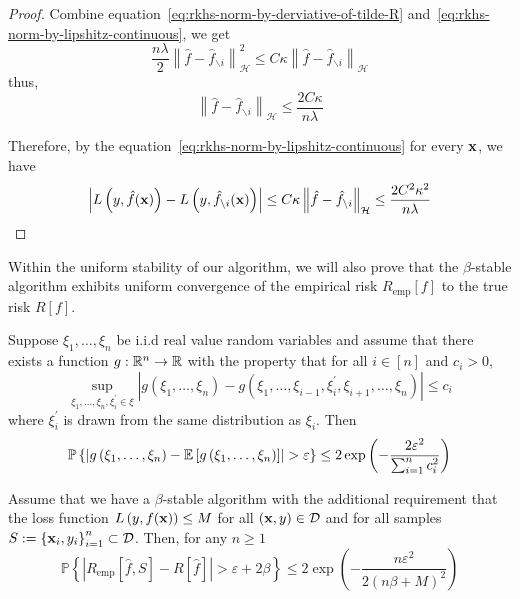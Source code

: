 \begin{proof}
	Combine equation~\eqref{eq:rkhs-norm-by-derviative-of-tilde-R} and~\eqref{eq:rkhs-norm-by-lipshitz-continuous}, we get
	\begin{equation}
		\frac{n\lambda}{2}\left\|\hat{f}-\hat{f}_{\backslash i}\right\|_{\mathcal{H}}^{2}\leq C\kappa\left\|\hat{f}-\hat{f}_{\backslash i}\right\|_{\mathcal{H}}
	\end{equation}
	thus,
	\begin{equation}
		\left\|\hat{f}-\hat{f}_{\backslash i}\right\|_{\mathcal{H}}\leq\frac{2C\kappa}{n\lambda}
	\end{equation}

	Therefore, by the equation~\eqref{eq:rkhs-norm-by-lipshitz-continuous} for every \(\mathbf{x}\), we have
	\begin{equation}
		\left|L\left(y,\hat{f}(\mathbf{x})\right)-L\left(y,\hat{f}_{\backslash i}(\mathbf{x})\right)\right|\leq C\kappa\left\|\hat{f}-\hat{f}_{\backslash i}\right\|_{\mathcal{H}}\leq\frac{2C^{2}\kappa^{2}}{n\lambda}
	\end{equation}
\end{proof}

Within the uniform stability of our algorithm, we will also prove that the \(\beta\)-stable algorithm exhibits uniform convergence of the empirical risk \(R_{\text{emp}}[f]\) to the true risk \(R[f]\).

\begin{theorem}\label{thm:McDiarmid-bound}
	Suppose \(\xi_{1},\ldots,\xi_{n}\) be i.i.d real value random variables and assume that there exists a function \(g:\mathbb{R}^{n}\rightarrow\mathbb{R}\) with the property that for all \(i\in[n]\) and \(c_{i}>0\),
	\begin{equation}
		\sup_{\xi_{1},\ldots,\xi_{n},\xi_{i}^{\prime}\in\xi}\left|g\left(\xi_{1},\ldots,\xi_{n}\right)-g\left(\xi_{1},\ldots,\xi_{i-1},\xi_{i}^{\prime},\xi_{i+1},\ldots,\xi_{n}\right)\right|\leq c_{i}
	\end{equation}
	where \(\xi_{i}^{\prime}\) is drawn from the same distribution as \(\xi_{i}\). Then
	\begin{equation}
		\mathbb{P}\left\{\left|g\left(\xi_{1},\ldots,\xi_{n}\right)-\bbE\left[g\left(\xi_{1},\ldots,\xi_{n}\right)\right]\right|>\varepsilon\right\}\leq 2\exp\left(-\frac{2\varepsilon^{2}}{\sum_{i=1}^{n}c_{i}^{2}}\right)
	\end{equation}
\end{theorem}

\begin{theorem}\label{thm:bousquet-and-elisseeff}
	Assume that we have a \(\beta\)-stable algorithm with the additional requirement that the loss function \(L\left(y,f(\mathbf{x})\right)\leq M\) for all \((\mathbf{x},y)\in\mathcal{D}\) and for all samples \(S:=\left\{\mathbf{x}_{i},y_{i}\right\}_{i=1}^{n}\subset\mathcal{D}\). Then, for any \(n\geq 1\)
	\begin{equation}
		\mathbb{P}\left\{\left|R_{\text{emp}}[\hat{f},S]-R[\hat{f}]\right|>\varepsilon+2\beta\right\}\leq 2\exp\left(-\frac{n\varepsilon^{2}}{2(n\beta+M)^{2}}\right)
	\end{equation}
\end{theorem}

